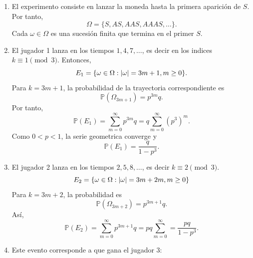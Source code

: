 \documentclass[12pt,a4paper]{article}
\begin{document}
    \begin{solucion}
        \begin{enumerate}
            \item[(a)] El experimento consiste en lanzar la moneda hasta la primera aparición de $S$. Por tanto,
            \begin{equation*}
                \Omega=\{S,AS,AAS,AAAS,\dots\}.
            \end{equation*}
            Cada $\omega\in\Omega$ es una sucesión finita que termina en el primer $S$.
            \item[(b)] El jugador 1 lanza en los tiempos $1,4,7,\dots$, es decir en los indices
            $k\equiv1\pmod{3}$. Entonces,
            \begin{equation*}
                E_{1}=\{\omega\in\Omega:\abs{\omega}=3m+1,m\geq0\}.
            \end{equation*}
            Para $k=3m+1$, la probabilidad de la trayectoria correspondiente es
            \begin{equation*}
                \mathbb{P}(\Omega_{3m+1})=p^{3m}q.
            \end{equation*}
            Por tanto,
            \begin{equation*}
                \mathbb{P}(E_{1})=\sum_{m=0}^{\infty}p^{3m}q=q\sum_{m=0}^{\infty}(p^{3})^{m}.
            \end{equation*}
            Como $0\lt p\lt1$, la serie geometrica converge y
            \begin{equation*}
                \mathbb{P}(E_{1})=\frac{q}{1-p^{3}}.
            \end{equation*}
            \item[(c)] El jugador 2 lanza en los tiempos $2,5,8,\dots$, es decir $k\equiv2\pmod{3}$.
            \begin{equation*}
                E_{2}=\{\omega\in\Omega:\abs{\omega}=3m+2m,m\geq0\}
            \end{equation*}
            Para $k=3m+2$, la probabilidad es
            \begin{equation*}
                \mathbb{P}(\Omega_{3m+2})=p^{3m+1}q.
            \end{equation*}
            Así,
            \begin{equation*}
                \mathbb{P}(E_{2})=\sum_{m=0}^{\infty}p^{3m+1}q=pq\sum_{m=0}^{\infty}=\frac{pq}{1-p^{3}}.
            \end{equation*}
            \item[(d)] Este evento corresponde a que gana el jugador 3:

\end{enumerate}
\end{solucion}
\end{document}

